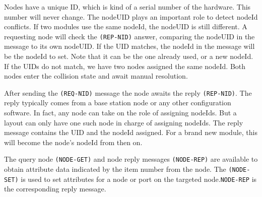 \begin{table}[ht!]
    \centering 
\end{table}

Nodes have a unique ID, which is kind of a serial number of the hardware. This number will never change. The nodeUID plays an important role to detect nodeId conflicts. If two modules use the same nodeId, the nodeUID is still different. A requesting node will check the \texttt{(REP-NID)} answer, comparing the nodeUID in the message to its own nodeUID. If the UID matches, the nodeId in the message will be the nodeId to set. Note that it can be the one already used, or a new nodeId. If the UIDs do not match, we have two nodes assigned the same nodeId. Both nodes enter the collision state and await manual resolution.

After sending the \texttt{(REQ-NID)} message the node awaits the reply \texttt{(REP-NID)}. The reply typically comes from a base station node or any other configuration software. In fact, any node can take on the role of assigning nodeIds. But a layout can only have one such node in charge of assigning nodeIds. The reply message contains the UID and the nodeId assigned. For a brand new module, this will become the node’s nodeId from then on.



The query node \texttt{(NODE-GET)} and node reply messages \texttt{(NODE-REP)} are available to obtain attribute data indicated by the item number from the node. The \texttt{(NODE-SET)} is used to set attributes for a node or port on the targeted node.\texttt{NODE-REP} is the corresponding reply message. 


